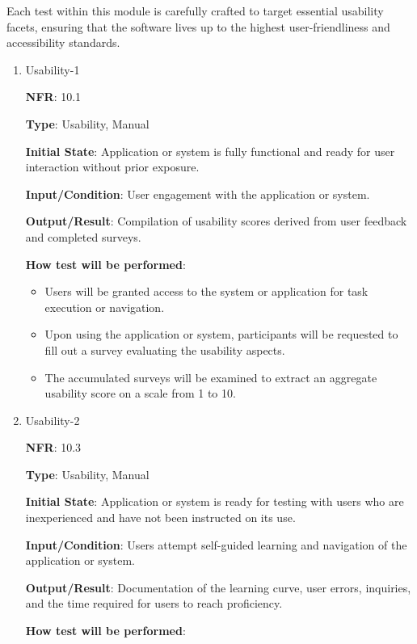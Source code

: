 \documentclass[12pt, titlepage]{article}
\begin{document}
Each test within this module is carefully crafted to target essential usability facets, ensuring that the software lives up to the highest user-friendliness and accessibility standards.


\begin{enumerate}

\item{Usability-1\\}

\textbf{NFR}: 10.1

\textbf{Type}: Usability, Manual

\textbf{Initial State}: Application or system is fully functional and ready for user interaction without prior exposure.

\textbf{Input/Condition}: User engagement with the application or system.

\textbf{Output/Result}: Compilation of usability scores derived from user feedback and completed surveys.

\textbf{How test will be performed}:

\begin{itemize}
    \item Users will be granted access to the system or application for task execution or navigation.
    \item Upon using the application or system, participants will be requested to fill out a survey evaluating the usability aspects.
    \item The accumulated surveys will be examined to extract an aggregate usability score on a scale from 1 to 10.
\end{itemize}

\item{Usability-2\\}

\textbf{NFR}: 10.3

\textbf{Type}: Usability, Manual

\textbf{Initial State}: Application or system is ready for testing with users who are inexperienced and have not been instructed on its use.

\textbf{Input/Condition}: Users attempt self-guided learning and navigation of the application or system.

\textbf{Output/Result}: Documentation of the learning curve, user errors, inquiries, and the time required for users to reach proficiency.

\textbf{How test will be performed}:


\end{enumerate}
\end{document}
